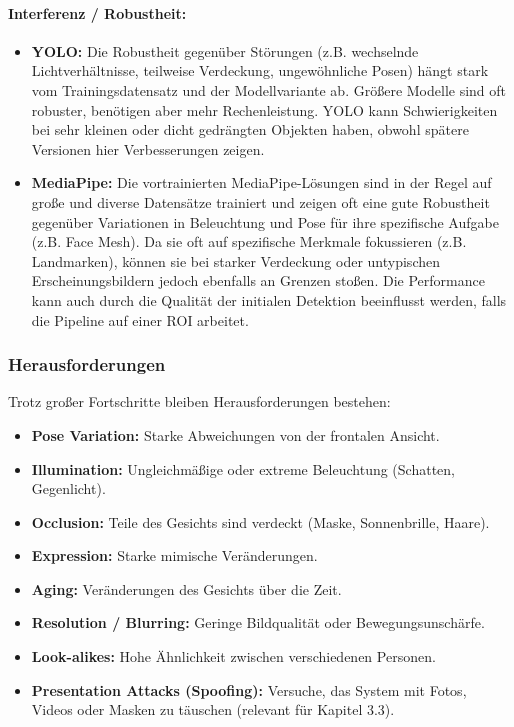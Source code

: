 \paragraph{Interferenz / Robustheit:}
\begin{itemize}
    \item \textbf{YOLO:} Die Robustheit gegenüber Störungen (z.B. wechselnde Lichtverhältnisse, teilweise Verdeckung, ungewöhnliche Posen) hängt stark vom Trainingsdatensatz und der Modellvariante ab. Größere Modelle sind oft robuster, benötigen aber mehr Rechenleistung. YOLO kann Schwierigkeiten bei sehr kleinen oder dicht gedrängten Objekten haben, obwohl spätere Versionen hier Verbesserungen zeigen.
    
    \item \textbf{MediaPipe:} Die vortrainierten MediaPipe-Lösungen sind in der Regel auf große und diverse Datensätze trainiert und zeigen oft eine gute Robustheit gegenüber Variationen in Beleuchtung und Pose für ihre spezifische Aufgabe (z.B. Face Mesh). Da sie oft auf spezifische Merkmale fokussieren (z.B. Landmarken), können sie bei starker Verdeckung oder untypischen Erscheinungsbildern jedoch ebenfalls an Grenzen stoßen. Die Performance kann auch durch die Qualität der initialen Detektion beeinflusst werden, falls die Pipeline auf einer ROI arbeitet.
\end{itemize}

\subsubsection{Herausforderungen}
Trotz großer Fortschritte bleiben Herausforderungen bestehen:

\begin{itemize}
    \item \textbf{Pose Variation:} Starke Abweichungen von der frontalen Ansicht.
    
    \item \textbf{Illumination:} Ungleichmäßige oder extreme Beleuchtung (Schatten, Gegenlicht).
    
    \item \textbf{Occlusion:} Teile des Gesichts sind verdeckt (Maske, Sonnenbrille, Haare).
    
    \item \textbf{Expression:} Starke mimische Veränderungen.
    
    \item \textbf{Aging:} Veränderungen des Gesichts über die Zeit.
    
    \item \textbf{Resolution / Blurring:} Geringe Bildqualität oder Bewegungsunschärfe.
    
    \item \textbf{Look-alikes:} Hohe Ähnlichkeit zwischen verschiedenen Personen.
    
    \item \textbf{Presentation Attacks (Spoofing):} Versuche, das System mit Fotos, Videos oder Masken zu täuschen (relevant für Kapitel 3.3).
\end{itemize}

